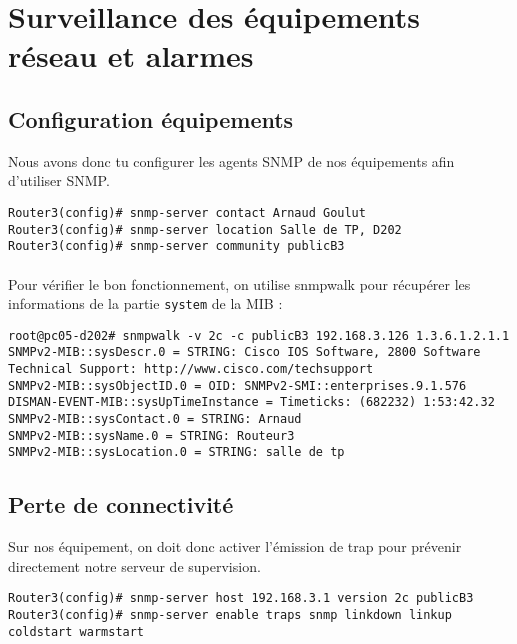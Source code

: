 \documentclass[12pt,a4paper,notitlepage]{article}
\begin{document}
\section{Surveillance des équipements réseau et alarmes}
\subsection{Configuration équipements}
Nous avons donc tu configurer les agents SNMP de nos équipements afin d'utiliser SNMP.\\
\begin{lstlisting}[title=Commandes Cisco pour configurer l'agent SNMP du routeur]
Router3(config)# snmp-server contact Arnaud Goulut
Router3(config)# snmp-server location Salle de TP, D202
Router3(config)# snmp-server community publicB3
\end{lstlisting}

\paragraph{} Pour vérifier le bon fonctionnement, on utilise snmpwalk pour récupérer les informations de la partie \texttt{system} de la MIB :

\begin{lstlisting}[title=Vérification du fonctionnement SNMP sur le routeur]
root@pc05-d202# snmpwalk -v 2c -c publicB3 192.168.3.126 1.3.6.1.2.1.1
SNMPv2-MIB::sysDescr.0 = STRING: Cisco IOS Software, 2800 Software
Technical Support: http://www.cisco.com/techsupport
SNMPv2-MIB::sysObjectID.0 = OID: SNMPv2-SMI::enterprises.9.1.576
DISMAN-EVENT-MIB::sysUpTimeInstance = Timeticks: (682232) 1:53:42.32
SNMPv2-MIB::sysContact.0 = STRING: Arnaud
SNMPv2-MIB::sysName.0 = STRING: Routeur3
SNMPv2-MIB::sysLocation.0 = STRING: salle de tp
\end{lstlisting}

\subsection{Perte de connectivité}
Sur nos équipement, on doit donc activer l'émission de trap pour prévenir directement notre serveur de supervision.

\begin{lstlisting}[title=Activation des traps pour l'état des liens]
Router3(config)# snmp-server host 192.168.3.1 version 2c publicB3
Router3(config)# snmp-server enable traps snmp linkdown linkup coldstart warmstart
\end{lstlisting}
\end{document}
